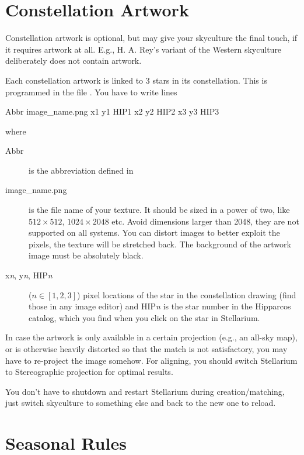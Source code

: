 \section{Constellation Artwork}
\label{sec:skycultures:artwork}

Constellation artwork is optional, but may give your skyculture the
final touch, if it requires artwork at all. E.g., H. A. Rey's variant
of the Western skyculture deliberately does not contain artwork.

Each constellation artwork is linked to 3 stars in its constellation. This
is programmed in the file . You have to write lines

\begin{configfile}
  Abbr image_name.png x1 y1 HIP1 x2 y2 HIP2 x3 y3 HIP3
\end{configfile}
where 
\begin{description}
\item[Abbr] is the abbreviation defined in 
\item[image\_name.png] is the file name of your texture. It should be
  sized in a power of two, like $512\times512$, $1024\times2048$
  etc. Avoid dimensions larger than 2048, they are not supported on
  all systems. You can distort images to better exploit the pixels,
  the texture will be stretched back. The background of the artwork
  image must be absolutely black.
\item[x\textit{n}, y\textit{n}, HIP\textit{n}] ($n\in[1, 2, 3]$) pixel locations of the
  star in the constellation drawing (find those in any image editor)
  and HIP\textit{n} is the star number in the Hipparcos catalog, which
  you find when you click on the star in Stellarium.
\end{description}

In case the artwork is only available in a certain projection (e.g.,
an all-sky map), or is otherwise heavily distorted so that the match
is not satisfactory, you may have to re-project the image somehow. For
aligning, you should switch Stellarium to Stereographic projection for
optimal results.

You don't have to shutdown and restart Stellarium during
creation/matching, just switch skyculture to something else and back
to the new one to reload.

\section{Seasonal Rules}
\label{sec:skycultures:seasonal_rules}

